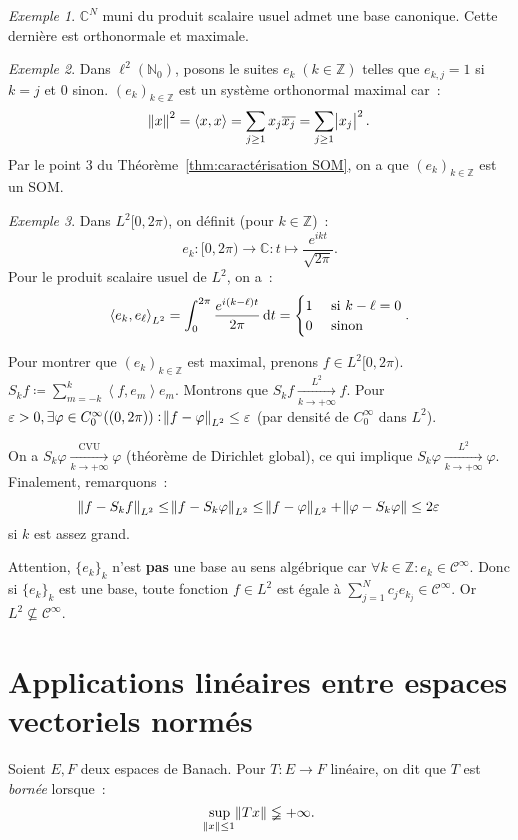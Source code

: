 \documentclass{report}
\newcommand{\C}{{\mathbb C}}
\newcommand{\Z}{{\mathbb Z}}
\newcommand{\N}{{\mathbb N}}
\newcommand{\scpr}[2]{\left\langle#1, #2\right\rangle}
\newcommand{\pinfty}{{+\infty}}
\theoremstyle{definition}
\theoremstyle{remark}
\newtheorem{ex}{Exemple}[chapter]
\begin{document}
\begin{ex}
$\C^N$ muni du produit scalaire usuel admet une base canonique. Cette dernière est orthonormale et maximale.
\end{ex}

\begin{ex}
Dans $\ell^2(\N_0)$, posons le suites $e_k \; (k \in \Z)$ telles que $e_{k,j} = 1$ si $k=j$ et $0$ sinon. $(e_k)_{k \in \Z}$ est un système orthonormal maximal car~:
\[\norm x^2 = \scpr xx = \sum_{j \geq 1}x_j\overline {x_j} = \sum_{j \geq 1}\abs {x_j}^2.\]
Par le point 3 du Théorème~\ref{thm:caractérisation SOM}, on a que $(e_k)_{k \in \Z}$ est un SOM.
\end{ex}

\begin{ex}
Dans $L^2[0, 2\pi)$, on définit (pour $k \in \Z$)~:
\[e_k : [0, 2\pi) \to \C : t \mapsto \frac {e^{ikt}}{\sqrt {2\pi}}.\]
Pour le produit scalaire usuel de $L^2$, on a~:
\[\scpr {e_k}{e_\ell}_{L^2} = \int_0^{2\pi}\frac {e^{i(k-\ell)t}}{2\pi}\dif t = \begin{cases}1 &\text{ si } k-\ell = 0 \\0 &\text{ sinon}\end{cases}.\]

Pour montrer que $(e_k)_{k \in \Z}$ est maximal, prenons $f \in L^2[0, 2\pi)$. $S_kf \coloneqq \sum_{m=-k}^k\scpr f{e_m}e_m.$ Montrons que $S_kf \xrightarrow[k \to \pinfty]{L^2} f$.
Pour $\varepsilon > 0, \exists \varphi \in C_0^\infty((0, 2\pi)) : \norm {f-\varphi}_{L^2} \leq \varepsilon$ (par densité de $C_0^\infty$ dans $L^2$).

On a $S_k\varphi \xrightarrow[k \to \pinfty]{\text{CVU}} \varphi$ (théorème de Dirichlet global), ce qui implique $S_k\varphi \xrightarrow[k \to \pinfty]{L^2} \varphi$.
Finalement, remarquons~:
\[\norm {f-S_kf}_{L^2} \leq \norm {f-S_k\varphi}_{L^2} \leq \norm {f-\varphi}_{L^2} + \norm {\varphi - S_k\varphi} \leq 2\varepsilon\]
si $k$ est assez grand.

Attention, $\{e_k\}_k$ n'est \textbf{pas} une base au sens algébrique car $\forall k \in \Z : e_k \in \mathcal C^\infty$. Donc si $\{e_k\}_k$ est une base, toute fonction $f \in L^2$ est
égale à $\sum_{j=1}^Nc_je_{k_j} \in \mathcal C^\infty$. Or $L^2 \not \subseteq \mathcal C^\infty$.
\end{ex}

\section{Applications linéaires entre espaces vectoriels normés}
Soient $E, F$ deux espaces de Banach. Pour $T : E \to F$ linéaire, on dit que $T$ est \textit{bornée} lorsque~:
\[\sup_{\norm x \leq 1}\norm {Tx} \lneqq \pinfty.\]
\end{document}
